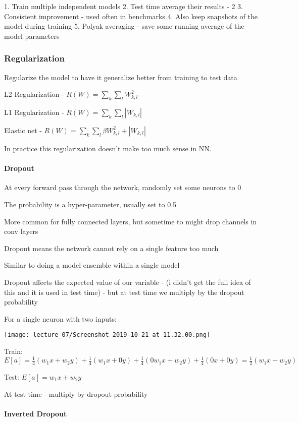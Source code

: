 1. Train multiple independent models
2. Test time average their results - 2%
3. Consistent improvement - used often in benchmarks
4. Also keep snapshots of the model during training
5. Polyak averaging - save some running average of the model parameters

\subsubsection{Regularization}

Regularize the model to have it generalize better from training to test data

L2 Regularization - $R(W) = \sum_k\sum_lW_{k,l}^2 $

L1 Regularization - $R(W) = \sum_k\sum_l | W_{k,l} |$

Elastic net - $R(W) = \sum_k \sum_l \beta W^2_{k,l} + | W_{k,l} |$

In practice this regularization doesn't make  too much sense in NN.

\paragraph{	Dropout }

At every forward pass through the network, randomly set some neurons to 0

The probability is a hyper-parameter, usually set to 0.5

More common for fully connected layers, but sometime to might drop channels in conv layers

Dropout means  the network cannot rely on a single feature too much

Similar to doing a model ensemble within a single model

Dropout affects the expected value of our variable - (i didn't get  the full idea of this and it is used in test time) - but at test time we multiply by the dropout probability

For a single neuron with two inputs:

\texttt{[image: lecture\_07/Screenshot 2019-10-21 at 11.32.00.png]}

Train: $E[a] = \frac{1}{4}(w_1x+w_2y)+\frac{1}{4}(w_1x+0y)+\frac{1}{4}(0w_1x+w_2y)+\frac{1}{4}(0x+0y) = \frac{1}{2}(w_1x+w_2y)$

Test: $E[a] = w_1x+w_2y$

At test time - multiply by dropout probability

\paragraph{Inverted Dropout}

